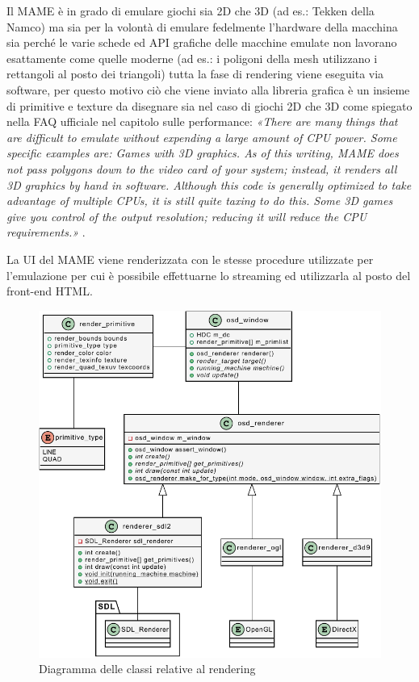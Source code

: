 Il MAME è in grado di emulare giochi sia 2D che 3D (ad es.: Tekken della Namco) ma sia per la volontà di emulare fedelmente l'hardware della macchina sia perché le varie schede ed API grafiche delle macchine emulate non lavorano esattamente come quelle moderne (ad es.: i poligoni della mesh utilizzano i rettangoli al posto dei triangoli) tutta la fase di rendering viene eseguita via software, per questo motivo ciò che viene inviato alla libreria grafica è un insieme di primitive e texture da disegnare sia nel caso di giochi 2D che 3D come spiegato nella FAQ ufficiale nel capitolo sulle performance: \textit{«There are many things that are difficult to emulate without expending a large amount of CPU power. Some specific examples are: Games with 3D graphics. As of this writing, MAME does not pass polygons down to the video card of your system; instead, it renders all 3D graphics by hand in software. Although this code is generally optimized to take advantage of multiple CPUs, it is still quite taxing to do this. Some 3D games give you control of the output resolution; reducing it will reduce the CPU requirements.»} \parencite{MAME_FAQ_Performance}.

La UI del MAME viene renderizzata con le stesse procedure utilizzate per l'emulazione per cui è possibile effettuarne lo streaming ed utilizzarla al posto del front-end HTML.

\begin{figure}[H]
	\includegraphics[width=\linewidth]{immagini/class_renderingSDLFull}
	\caption{Diagramma delle classi relative al rendering}
	\label{fig:class_renderingSDLFull}
\end{figure}

